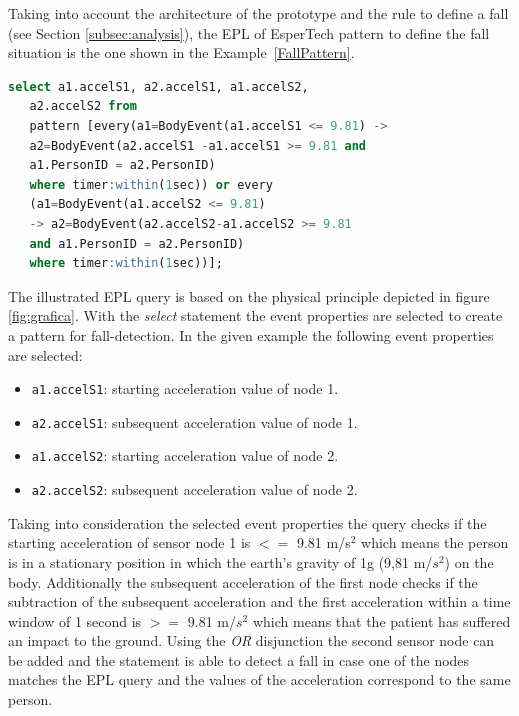 \documentclass[conference]{IEEEtran}
\theoremstyle{definition}
\begin{document}
Taking into account the architecture of the prototype and the rule to define a fall (see Section \ref{subsec:analysis}), 
the EPL of EsperTech pattern to define the fall situation is the one shown in the Example~\ref{FallPattern}.

\begin{lstlisting}[basicstyle=\ttfamily\footnotesize,language=SQL,caption=Fall pattern,label=FallPattern]
  select a1.accelS1, a2.accelS1, a1.accelS2, 
   a2.accelS2 from 
   pattern [every(a1=BodyEvent(a1.accelS1 <= 9.81) -> 
   a2=BodyEvent(a2.accelS1 -a1.accelS1 >= 9.81 and 
   a1.PersonID = a2.PersonID) 
   where timer:within(1sec)) or every 
   (a1=BodyEvent(a1.accelS2 <= 9.81)
   -> a2=BodyEvent(a2.accelS2-a1.accelS2 >= 9.81
   and a1.PersonID = a2.PersonID) 
   where timer:within(1sec))];
 \end{lstlisting}

The illustrated EPL query is based on the physical principle depicted in 
figure \ref{fig:grafica}. With the \textit{select} statement the event properties 
are selected to create a pattern for fall-detection. In the given example the
following event properties are selected:

\begin{itemize}
 \item \texttt{a1.accelS1}: starting acceleration value of node 1.
 \item \texttt{a2.accelS1}: subsequent acceleration value of node 1.
 \item \texttt{a1.accelS2}: starting acceleration value of node 2.
 \item \texttt{a2.accelS2}: subsequent acceleration value of node 2.
\end{itemize}

Taking into consideration the selected event properties the query checks if the 
starting acceleration of sensor node 1 is $<=$ 9.81 m/s$^2$ which means the person 
is in a stationary position in which the earth's gravity of 1g (9,81 m/$s^2$) on 
the body. Additionally the subsequent acceleration of the first node checks if the 
subtraction of the subsequent acceleration and the first acceleration within a 
time window of 1 second is $>=$ 9.81 m/$s^2$ which means that the patient has 
suffered an impact to the ground. Using the \textit{OR} disjunction the second 
sensor node can be added and the statement is able to detect a fall in case one 
of the nodes matches the EPL query and the values of the acceleration correspond 
to the same person. 
 
\end{document}
